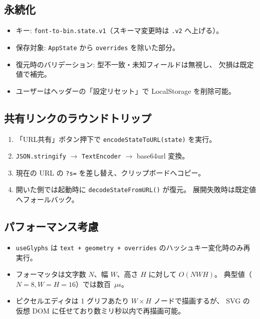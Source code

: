 \subsection{永続化}

\begin{itemize}[leftmargin=*,itemsep=2pt]
  \item キー: \texttt{font-to-bin.state.v1}（スキーマ変更時は \texttt{.v2} へ上げる）。
  \item 保存対象: \texttt{AppState} から \texttt{overrides} を除いた部分。
  \item 復元時のバリデーション: 型不一致・未知フィールドは無視し、
        欠損は既定値で補完。
  \item ユーザーはヘッダーの「設定リセット」で LocalStorage を削除可能。
\end{itemize}

\subsection{共有リンクのラウンドトリップ}

\begin{enumerate}[leftmargin=*,itemsep=2pt]
  \item 「URL共有」ボタン押下で \texttt{encodeStateToURL(state)} を実行。
  \item \texttt{JSON.stringify} $\rightarrow$ \texttt{TextEncoder}
        $\rightarrow$ base64url 変換。
  \item 現在の URL の \texttt{?s=} を差し替え、クリップボードへコピー。
  \item 開いた側では起動時に \texttt{decodeStateFromURL()} が復元。
        展開失敗時は既定値へフォールバック。
\end{enumerate}

\subsection{パフォーマンス考慮}

\begin{itemize}[leftmargin=*,itemsep=2pt]
  \item \texttt{useGlyphs} は \texttt{text + geometry + overrides}
        のハッシュキー変化時のみ再実行。
  \item フォーマッタは文字数 $N$、幅 $W$、高さ $H$ に対して $O(NWH)$。
        典型値（$N=8, W=H=16$）では数百~$\mu$s。
  \item ピクセルエディタは 1 グリフあたり $W\times H$ ノードで描画するが、
        SVG の仮想 DOM に任せており数ミリ秒以内で再描画可能。
\end{itemize}

